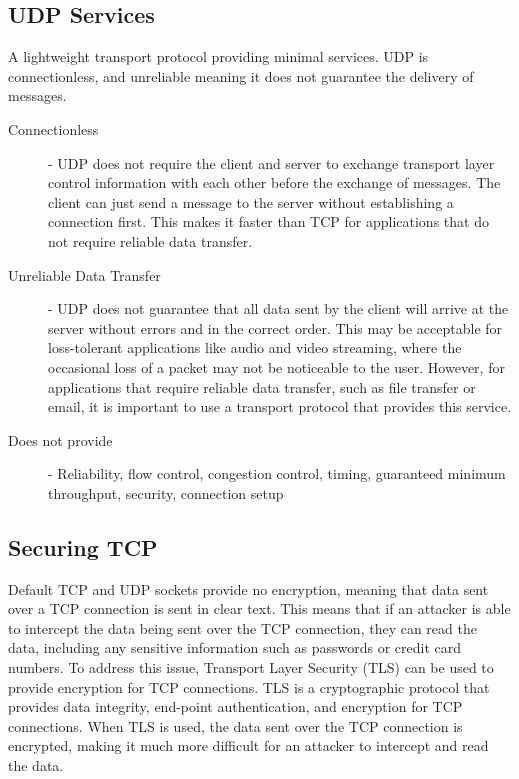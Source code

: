 \documentclass[12pt letter]{report}
\begin{document}
\subsection{UDP Services}

A lightweight transport protocol providing minimal services. UDP is
connectionless, and unreliable meaning it does not guarantee the
delivery of messages.
\begin{description}
  \item[Connectionless]  - UDP does not require the client and server
    to exchange transport
    layer control information with each other before the exchange of
    messages. The client can just send a message to the server without
    establishing a connection first. This makes it faster than TCP
    for applications that do not require reliable data transfer.
  \item[Unreliable Data Transfer] - UDP does not guarantee that all
    data sent by the client will arrive at the server without errors
    and in the correct order. This may be acceptable for
    loss-tolerant applications like audio and video streaming, where
    the occasional loss of a packet may not be noticeable to the
    user. However, for applications that require reliable data
    transfer, such as file transfer or email, it is important to use
    a transport protocol that provides this service.
  \item[Does not provide] - Reliability, flow control, congestion
    control, timing, guaranteed minimum throughput, security, connection setup
\end{description}

\subsection{Securing TCP}

Default TCP and UDP sockets provide no encryption, meaning that data sent
over a TCP connection is sent in clear text. This means that if an
attacker is able to intercept the data being sent over the TCP
connection, they can read the data, including any sensitive information such as
passwords or credit card numbers. To address this issue, Transport
Layer Security (TLS) can be used to
provide encryption for TCP connections. TLS is a cryptographic
protocol that provides data integrity, end-point authentication, and
encryption for TCP connections. When TLS is used, the data sent over
the TCP connection is encrypted, making it much more difficult for an
attacker to intercept and read the data.
\end{document}
